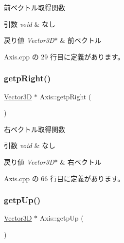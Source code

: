 前ベクトル取得関数 


\begin{DoxyParams}{引数}
{\em void} & なし \\
\hline
\end{DoxyParams}

\begin{DoxyRetVals}{戻り値}
{\em Vector3\+D$\ast$} & 前ベクトル \\
\hline
\end{DoxyRetVals}


 Axis.\+cpp の 29 行目に定義があります。

\mbox{\label{class_axis_a5562bdd19fc244dc78f4e6cce018ca5d}} 
\subsubsection{\texorpdfstring{getp\+Right()}{getpRight()}}
{\footnotesize\ttfamily \mbox{\hyperlink{class_vector3_d}{Vector3D}} $\ast$ Axis\+::getp\+Right (\begin{DoxyParamCaption}{ }\end{DoxyParamCaption})}



右ベクトル取得関数 


\begin{DoxyParams}{引数}
{\em void} & なし \\
\hline
\end{DoxyParams}

\begin{DoxyRetVals}{戻り値}
{\em Vector3\+D$\ast$} & 右ベクトル \\
\hline
\end{DoxyRetVals}


 Axis.\+cpp の 66 行目に定義があります。

\mbox{\label{class_axis_af9b293c3e3ad85321382f112d7afa538}} 
\subsubsection{\texorpdfstring{getp\+Up()}{getpUp()}}
{\footnotesize\ttfamily \mbox{\hyperlink{class_vector3_d}{Vector3D}} $\ast$ Axis\+::getp\+Up (\begin{DoxyParamCaption}{ }\end{DoxyParamCaption})}



